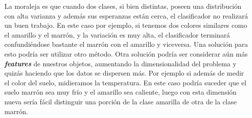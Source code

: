 La moraleja es que cuando dos clases, si bien distintas, poseen una distribución con alta varianza y además sus esperanzas están cerca, el clasificador no realizará un buen trabajo. En este caso por ejemplo, si tenemos dos colores similares como el amarillo y el marrón, y la variación es muy alta, el clasificador terminará confundiéndose bastante el marrón con el amarillo y viceversa. Una solución para esto podría ser utilizar otro método. Otra solución podría ser considerar aún más \textit{\textbf{features}} de nuestros objetos, aumentando la dimensionalidad del problema y quizás haciendo que los datos se dispersen más. Por ejemplo si además de medir el color del suelo, midieramos la temperatura. En este caso podría suceder que el suelo marrón sea muy frío y el amarillo sea caliente, luego con esta dimensión nueva sería fácil distinguir una porción de la clase amarilla de otra de la clase marrón.
